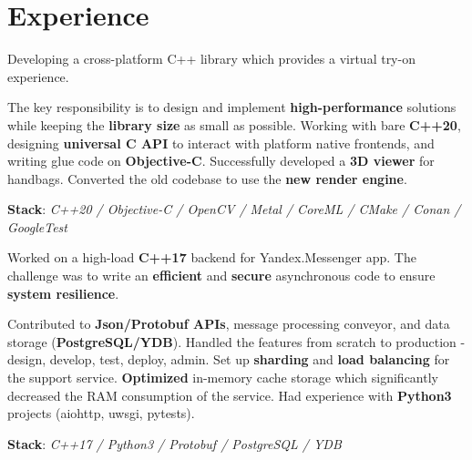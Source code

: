 \documentclass[]{deedy-resume}
\begin{document}
\begin{minipage}[t]{0.70\textwidth}


\section{Experience}


Developing a cross-platform C++ library which provides a virtual try-on experience. 
\begin{tightitemize}
    \tightitem The key responsibility is to design and implement \textbf{high-performance} solutions while keeping the \textbf{library size} as small as possible.
    \tightitem Working with bare \textbf{C++20}, designing \textbf{universal C API} to interact with platform native frontends, and writing glue code on \textbf{Objective-C}.
    \tightitem Successfully developed a \textbf{3D viewer} for handbags.
    \tightitem Converted the old codebase to use the \textbf{new render engine}.
\end{tightitemize}
\textbf{Stack}: \textit{C++20 / Objective-C / OpenCV / Metal / CoreML / CMake / Conan / GoogleTest}

\sectionspace



Worked on a high-load \textbf{C++17} backend for Yandex.Messenger app. The challenge was to write an \textbf{efficient} and \textbf{secure} asynchronous code to ensure \textbf{system resilience}.
\begin{tightitemize}
    \tightitem Contributed to \textbf{Json/Protobuf APIs}, message processing conveyor, and data storage (\textbf{PostgreSQL/YDB}).
    \tightitem Handled the features from scratch to production - design, develop, test, deploy, admin.
    \tightitem Set up \textbf{sharding} and \textbf{load balancing} for the support service.
    \tightitem \textbf{Optimized} in-memory cache storage which significantly decreased the RAM consumption of the service.
    \tightitem Had experience with \textbf{Python3} projects (aiohttp, uwsgi, pytests).
\end{tightitemize}
\textbf{Stack}: \textit{C++17 / Python3 / Protobuf / PostgreSQL / YDB}


\end{minipage}
\end{document}

